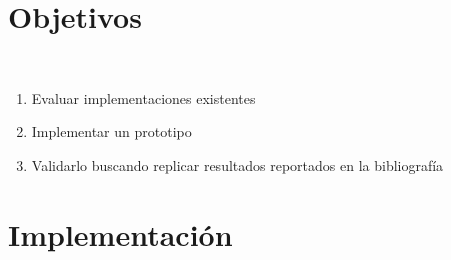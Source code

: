 \documentclass[aspectratio=169]{beamer}
\begin{document}
\section{Objetivos}

\begin{frame}{~}

  \begin{enumerate}
    \item Evaluar implementaciones existentes
    \item Implementar un prototipo
    \item Validarlo buscando replicar resultados reportados en la bibliografía
  \end{enumerate}
\end{frame}

\section{Implementación}
\end{document}

